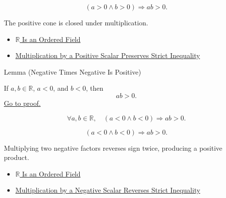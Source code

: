 \begin{remark*}
\[
(a>0\land b>0)\Rightarrow ab>0.
\]
\end{remark*}

\begin{remark*}[Interpretation]
The positive cone is closed under multiplication.
\end{remark*}

\begin{dependencies}
\begin{itemize}
  \item \hyperref[thm:r-is-an-ordered-field]{$\mathbb{R}$ Is an Ordered Field}
  \item \hyperref[thm:ineq-multiply-positive]{Multiplication by a Positive Scalar Preserves Strict Inequality}
\end{itemize}
\end{dependencies}

\begin{lemmabox}{Lemma (Negative Times Negative Is Positive)}
\begin{lemma}\label{lem:negative-times-negative-is-positive}
If $a,b\in\mathbb{R}$, $a<0$, and $b<0$, then
\[
ab>0.
\]
\hyperref[prf:negative-times-negative-is-positive]{Go to proof.}
\end{lemma}
\end{lemmabox}

\begin{remark*}
\[
\forall a,b\in\mathbb{R},\quad (a<0\land b<0)\Rightarrow ab>0.
\]
\end{remark*}

\begin{remark*}
\[
(a<0\land b<0)\Rightarrow ab>0.
\]
\end{remark*}

\begin{remark*}[Interpretation]
Multiplying two negative factors reverses sign twice, producing a positive product.
\end{remark*}

\begin{dependencies}
\begin{itemize}
  \item \hyperref[thm:r-is-an-ordered-field]{$\mathbb{R}$ Is an Ordered Field}
  \item \hyperref[thm:ineq-multiply-negative]{Multiplication by a Negative Scalar Reverses Strict Inequality}
\end{itemize}
\end{dependencies}

